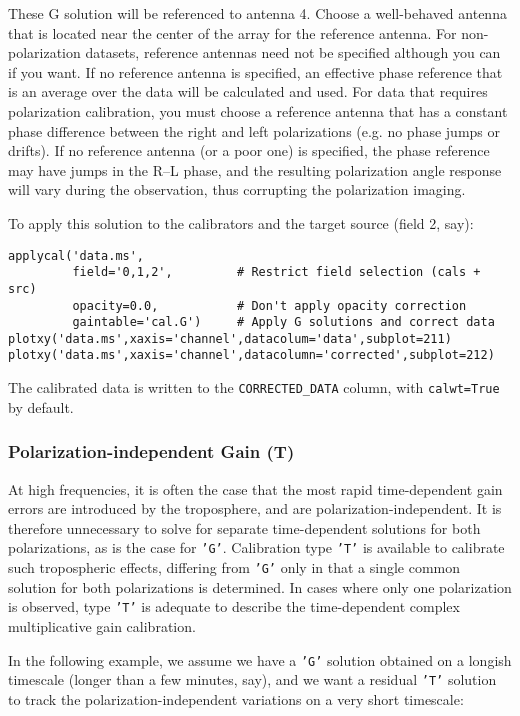 These G solution will be referenced to antenna 4.  Choose a
well-behaved antenna that is located near the center of the array for
the reference antenna.  For non-polarization datasets, reference
antennas need not be specified although you can if you want.  If no
reference antenna is specified, an effective phase reference that is
an average over the data will be calculated and used.  For data that
requires polarization calibration, you must choose a reference antenna
that has a constant phase difference between the right and left
polarizations (e.g. no phase jumps or drifts).  If no reference
antenna (or a poor one) is specified, the phase reference may have
jumps in the R--L phase, and the resulting polarization angle response
will vary during the observation, thus corrupting the polarization
imaging.

To apply this solution to the calibrators and the target source (field
2, say):
\small
\begin{verbatim}
applycal('data.ms',
         field='0,1,2',         # Restrict field selection (cals + src)
         opacity=0.0,           # Don't apply opacity correction
         gaintable='cal.G')     # Apply G solutions and correct data
plotxy('data.ms',xaxis='channel',datacolum='data',subplot=211)
plotxy('data.ms',xaxis='channel',datacolumn='corrected',subplot=212)
\end{verbatim}
\normalsize
The calibrated data is written to the {\tt CORRECTED\_DATA} column, with 
{\tt calwt=True} by default.

\subsubsection{Polarization-independent Gain (T)}
\label{section:cal.solve.gain.t}

At high frequencies, it is often the case that the most rapid
time-dependent gain errors are introduced by the troposphere, and are
polarization-independent.  It is therefore unnecessary to solve for
separate time-dependent solutions for both polarizations, as is the
case for {\tt 'G'}.  Calibration type {\tt 'T'} is available to calibrate such
tropospheric effects, differing from {\tt 'G'} only in that a single common
solution for both polarizations is determined.  In cases where only
one polarization is observed, type {\tt 'T'} is adequate to describe the
time-dependent complex multiplicative gain calibration.

In the following example, we assume we have a {\tt 'G'} solution obtained on
a longish timescale (longer than a few minutes, say), and we want a residual
{\tt 'T'} solution to track the polarization-independent variations on a
very short timescale:

